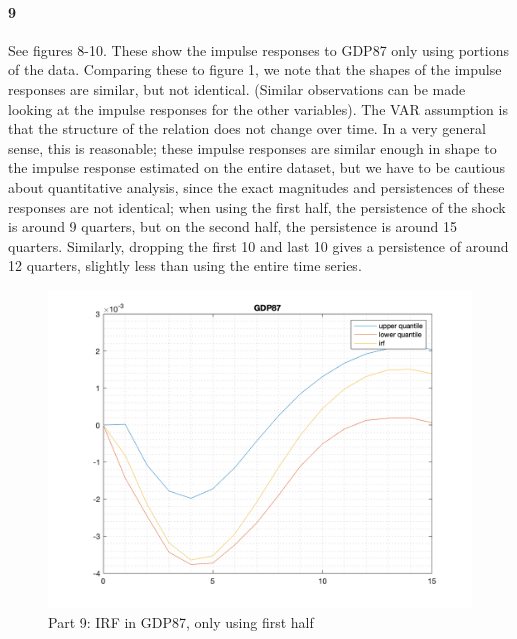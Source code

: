 \documentclass[10pt,letter]{article}
\newcommand{\problempart}[1]{\paragraph{#1}}
\begin{document}
\problempart{9} See figures 8-10. These show the impulse responses to GDP87 only using portions of the data. Comparing these to figure 1, we note that the shapes of the impulse responses are similar, but not identical. (Similar observations can be made looking at the impulse responses for the other variables). The VAR assumption is that the structure of the relation does not change over time. In a very general sense, this is reasonable; these impulse responses are similar enough in shape to the impulse response estimated on the entire dataset, but we have to be cautious about quantitative analysis, since the exact magnitudes and persistences of these responses are not identical; when using the first half, the persistence of the shock is around 9 quarters, but on the second half, the persistence is around 15 quarters. Similarly, dropping the first 10 and last 10 gives a persistence of around 12 quarters, slightly less than using the entire time series.
\begin{figure}
\begin{center}
\includegraphics[width=15cm]{ps9fig8}
\caption{Part 9: IRF in GDP87, only using first half}
\end{center}
\end{figure}
\end{document}
